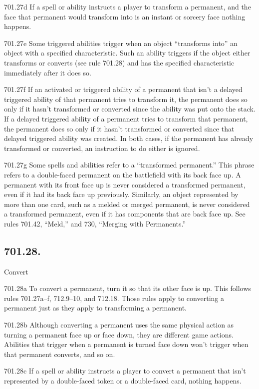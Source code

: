 701.27d If a spell or ability instructs a player to transform a permanent, and the face that permanent would transform into is an instant or sorcery face nothing happens.

701.27e Some triggered abilities trigger when an object “transforms into” an object with a specified characteristic. Such an ability triggers if the object either transforms or converts (see rule 701.28) and has the specified characteristic immediately after it does so.

701.27f If an activated or triggered ability of a permanent that isn’t a delayed triggered ability of that permanent tries to transform it, the permanent does so only if it hasn’t transformed or converted since the ability was put onto the stack. If a delayed triggered ability of a permanent tries to transform that permanent, the permanent does so only if it hasn’t transformed or converted since that delayed triggered ability was created. In both cases, if the permanent has already transformed or converted, an instruction to do either is ignored.

701.27g Some spells and abilities refer to a “transformed permanent.” This phrase refers to a double-faced permanent on the battlefield with its back face up. A permanent with its front face up is never considered a transformed permanent, even if it had its back face up previously. Similarly, an object represented by more than one card, such as a melded or merged permanent, is never considered a transformed permanent, even if it has components that are back face up. See rules 701.42, “Meld,” and 730, “Merging with Permanents.”

\subsection*{701.28.}
Convert

701.28a To convert a permanent, turn it so that its other face is up. This follows rules 701.27a–f, 712.9–10, and 712.18. Those rules apply to converting a permanent just as they apply to transforming a permanent.

701.28b Although converting a permanent uses the same physical action as turning a permanent face up or face down, they are different game actions. Abilities that trigger when a permanent is turned face down won’t trigger when that permanent converts, and so on.

701.28c If a spell or ability instructs a player to convert a permanent that isn’t represented by a double-faced token or a double-faced card, nothing happens.

